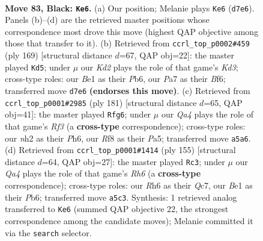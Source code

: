 \documentclass[11pt]{article}
\begin{document}
\clearpage

\begin{figure}[p]\centering
\begin{subfigure}{0.46\textwidth}\centering
\resizebox{\linewidth}{!}{%
\newchessgame
\chessboard[
  setfen={5r2/p2k2p1/7r/q6P/3P4/4P3/6QN/4b2K b - - 1 83},
  showmover=false,
  pgfstyle=straightmove, color=movearrow, markmove={d7-e6}
]}
\caption{}
\end{subfigure}\hfill
\begin{subfigure}{0.46\textwidth}\centering
\resizebox{\linewidth}{!}{%
\newchessgame
\chessboard[
  setfen={8/8/1p1k1b1p/7P/3q4/P7/1PQ5/KB6 b - - 27 85},
  showmover=false,
  pgfstyle=straightmove, color=movearrow, markmove={d6-d5}
]}
\caption{}
\end{subfigure}
\\[4pt]
\begin{subfigure}{0.46\textwidth}\centering
\resizebox{\linewidth}{!}{%
\newchessgame
\chessboard[
  setfen={4k3/2Q5/5r1p/pP5p/6r1/6P1/6K1/8 b - - 5 91},
  showmover=false,
  pgfstyle=straightmove, color=movearrow, markmove={f6-g6}
]}
\caption{}
\end{subfigure}\hfill
\begin{subfigure}{0.46\textwidth}\centering
\resizebox{\linewidth}{!}{%
\newchessgame
\chessboard[
  setfen={1k6/2q5/1p6/1P1QN1P1/3P1K2/p6r/5P2/8 b - - 0 78},
  showmover=false,
  pgfstyle=straightmove, color=movearrow, markmove={h3-c3}
]}
\caption{}
\end{subfigure}
\caption{\textbf{Move 83, Black: \texttt{Ke6}.} (a) Our position; Melanie plays \texttt{Ke6} (\texttt{d7e6}). Panels (b)--(d) are the retrieved master positions whose correspondence most drove this move (highest QAP objective among those that transfer to it). (b) Retrieved from \texttt{ccrl\_top\_p0002\#459} (ply 169) [structural distance $d$=67, QAP obj=22]: the master played \texttt{Kd5}; under $\mu$ our \emph{Kd2} plays the role of that game's \emph{Kd3}; cross-type roles: our \emph{B}e1 as their \emph{P}b6, our \emph{P}a7 as their \emph{B}f6; transferred move \texttt{d7e6} \textbf{(endorses this move)}. (c) Retrieved from \texttt{ccrl\_top\_p0001\#2985} (ply 181) [structural distance $d$=65, QAP obj=41]: the master played \texttt{Rfg6}; under $\mu$ our \emph{Qa4} plays the role of that game's \emph{Rf3} (a \textbf{cross-type} correspondence); cross-type roles: our \emph{n}h2 as their \emph{P}h6, our \emph{R}f8 as their \emph{P}a5; transferred move \texttt{a5a6}. (d) Retrieved from \texttt{ccrl\_top\_p0001\#1414} (ply 155) [structural distance $d$=64, QAP obj=27]: the master played \texttt{Rc3}; under $\mu$ our \emph{Qa4} plays the role of that game's \emph{Rh6} (a \textbf{cross-type} correspondence); cross-type roles: our \emph{R}h6 as their \emph{Q}c7, our \emph{B}e1 as their \emph{P}b6; transferred move \texttt{a5c3}. Synthesis: 1 retrieved analog transferred to \texttt{Ke6} (summed QAP objective 22, the strongest correspondence among the candidate moves); Melanie committed it via the \texttt{search} selector.}
\label{fig:thought-m165}
\end{figure}
\end{document}
